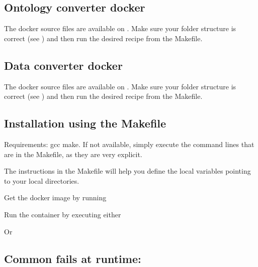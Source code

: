 \documentclass[letterpaper,10pt,english]{sphinxmanual}
\begin{document}
\subsection{Ontology converter docker}
\label{\detokenize{docker:ontology-converter-docker}}
The docker source files are available on .
Make sure your folder structure is correct (see {\hyperref[\detokenize{structure:structure}]{}}) and then run the desired recipe from the Makefile.


\subsection{Data converter docker}
\label{\detokenize{docker:data-converter-docker}}
The docker source files are available on .
Make sure your folder structure is correct (see {\hyperref[\detokenize{structure:structure}]{}}) and then run the desired recipe from
the Makefile.


\subsection{Installation using the Makefile}
\label{\detokenize{docker:installation-using-the-makefile}}\label{\detokenize{docker:makefile}}
Requirements: gcc make. If not available, simply execute the command lines that are in the Makefile, as they are very explicit.

The instructions in the Makefile will help you define the local variables pointing to your local directories.

Get the docker image by running

\begin{sphinxVerbatim}[commandchars=\\\{\}]
\end{sphinxVerbatim}

Run the container by executing either

\begin{sphinxVerbatim}[commandchars=\\\{\}]
 Or
\end{sphinxVerbatim}


\subsection{Common fails at runtime:}
\label{\detokenize{docker:common-fails-at-runtime}}
\begin{sphinxVerbatim}[commandchars=\\\{\}]
\end{sphinxVerbatim}
\end{document}
